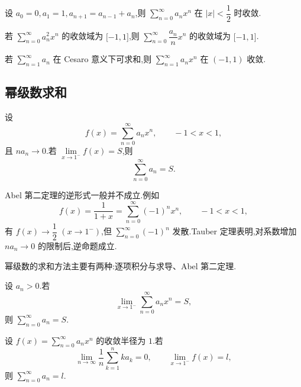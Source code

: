 \documentclass[../数学分析培优讲义.tex]{subfiles}
\begin{document}
\begin{example}
设 $a_0=0,a_1=1,a_{n+1}=a_{n-1}+a_n$,则 $\displaystyle\sum\limits_{n=0}^{\infty}a_nx^n$ 在 $|x|<\dfrac{1}{2}$ 时收敛.
\end{example}
\exampleblank

\begin{example}
若 $\displaystyle\sum\limits_{n=0}^{\infty}a_n^2x^n$ 的收敛域为 $\lbrack -1,1\rbrack$,则 $\displaystyle\sum\limits_{n=0}^{\infty}\dfrac{a_n}{n}x^n$ 的收敛域为 $\lbrack -1,1\rbrack$.
\end{example}
\exampleblank

\begin{example}
若 $\displaystyle\sum\limits_{n=1}^{\infty}a_n$ 在 Cesaro 意义下可求和,则 $\displaystyle\sum\limits_{n=1}^{\infty}a_nx^n$ 在 $(-1,1)$ 收敛.
\end{example}
\exampleblank


\newpage

\subsection{幂级数求和}

\begin{theorem}[Tauber 定理 $*$]
设
\[
    f(x)=\sum\limits_{n=0}^{\infty}a_nx^n,
    \qquad -1<x<1,
\]
且 $na_n\to0$.若 $\displaystyle\lim\limits_{x\to1^-}f(x)=S$,则
\[
    \sum\limits_{n=0}^{\infty}a_n=S.
\]
\end{theorem}

\begin{remark}
Abel 第二定理的逆形式一般并不成立.例如
\[
    f(x)=\dfrac{1}{1+x}=\sum\limits_{n=0}^{\infty}(-1)^nx^n,
    \qquad -1<x<1,
\]
有 $f(x)\to\dfrac{1}{2}$ $(x\to1^-)$,但 $\displaystyle\sum\limits_{n=0}^{\infty}(-1)^n$ 发散.Tauber 定理表明,对系数增加 $na_n\to0$ 的限制后,逆命题成立.
\end{remark}

幂级数的求和方法主要有两种:逐项积分与求导、Abel 第二定理.

\begin{example}
设 $a_n>0$.若
\[
    \lim\limits_{x\to1^-}\sum\limits_{n=0}^{\infty}a_nx^n=S,
\]
则 $\displaystyle\sum\limits_{n=0}^{\infty}a_n=S$.
\end{example}
\exampleblank

\begin{example}
设 $f(x)=\displaystyle\sum\limits_{n=0}^{\infty}a_nx^n$ 的收敛半径为 $1$.若
\[
    \lim\limits_{n\to\infty}\dfrac{1}{n}\sum\limits_{k=1}^{n}ka_k=0,
    \qquad
    \lim\limits_{x\to1^-}f(x)=l,
\]
则 $\displaystyle\sum\limits_{n=0}^{\infty}a_n=l$.
\end{example}
\exampleblank
\end{document}
